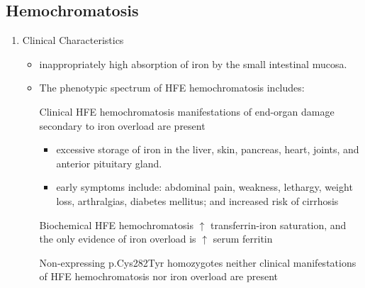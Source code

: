 \documentclass{scrartcl}
\begin{document}
\subsection{Hemochromatosis}
\label{sec:orgc99abbe}
\begin{enumerate}
\item Clinical Characteristics
\label{sec:orgd5ead39}
\begin{itemize}
\item inappropriately high absorption of iron by the small intestinal
mucosa.

\item The phenotypic spectrum of HFE hemochromatosis includes:

\item[{Clinical HFE hemochromatosis}] manifestations of end-organ damage secondary to iron overload are present
\begin{itemize}
\item excessive storage of iron in the liver, skin, pancreas, heart, joints, and anterior pituitary gland.
\item early symptoms include: abdominal pain, weakness, lethargy, weight loss, arthralgias, diabetes mellitus; and increased risk of cirrhosis
\end{itemize}
\item[{Biochemical HFE hemochromatosis}] \(\uparrow\) transferrin-iron saturation, and the only evidence of iron overload is \(\uparrow\) serum ferritin
\item[{Non-expressing p.Cys282Tyr homozygotes}] neither clinical manifestations of HFE hemochromatosis nor iron overload are present
\end{itemize}


\end{enumerate}
\end{document}
